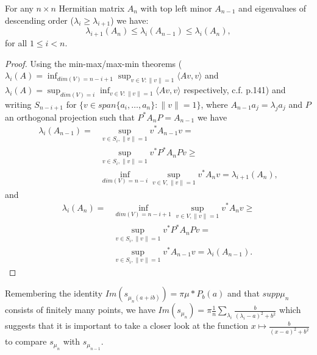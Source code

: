 \begin{theorem}
	For any $n\times n$ Hermitian matrix $A_n$ with top left minor $A_{n-1}$ and eigenvalues of descending order ($\lambda_i\geq\lambda_{i+1}$) we have:
	\begin{equation*}
		\lambda_{i+1}(A_n)\leq\lambda_i(A_{n-1})\leq\lambda_i(A_n), 
	\end{equation*}
	for all $1\leq i < n$.
\end{theorem}
\begin{proof}
Using the min-max/max-min theorems \newline($\lambda_i(A)=\inf_{dim(V)=n-i+1}\sup_{v\in V : \|v\|=1}\langle Av,v\rangle$ and \newline$\lambda_i(A)=\sup_{dim(V)=i}\inf_{v\in V : \|v\|=1}\langle Av,v\rangle$ respectively, c.f. \cite{TeschlQM} p.141) and writing $S_{n-i+1}$ for $\{v\in span\{a_i,\dots,a_n\}: \|v\|=1\}$, where $A_{n-1}a_j=\lambda_j a_j$ and $P$ an orthogonal projection such that $P^*A_nP=A_{n-1}$ we have
	\begin{align*}
		\lambda_i(A_{n-1}) =
		&\sup_{v\in S_i,\|v\|=1}v^*A_{n-1}v =\\
		&\sup_{v\in S_i,\|v\|=1}v^*P^*A_nPv\geq\\
		&\inf_{dim(V)=n-i}\sup_{v\in V,\|v\|=1}v^*A_nv =
		\lambda_{i+1}(A_n),
	\end{align*}
	and
	\begin{align*}
		\lambda_i(A_n) =
		&\inf_{dim(V)=n-i+1}\sup_{v\in V,\|v\|=1}v^*A_nv \geq\\
		&\sup_{v\in S_i,\|v\|=1}v^*P^*A_nPv =\\
		&\sup_{v\in S_i,\|v\|=1}v^*A_{n-1}v =
		\lambda_i(A_{n-1}).%
	\end{align*}
\end{proof}

Remembering the identity $Im(s_{\mu_n(a+ib)})=\pi\mu*P_b(a)$ and that $supp\mu_n$ consists of finitely many points, we have $Im(s_{\mu_n})=\pi\frac{1}{n}\sum_{\lambda_i}\frac{b}{(\lambda_i-a)^2+b^2}$ which suggests that it is important to take a closer look at the function $x\mapsto\frac{b}{(x-a)^2+b^2}$ to compare $s_{\mu_n}$ with $s_{\mu_{n-1}}$.

